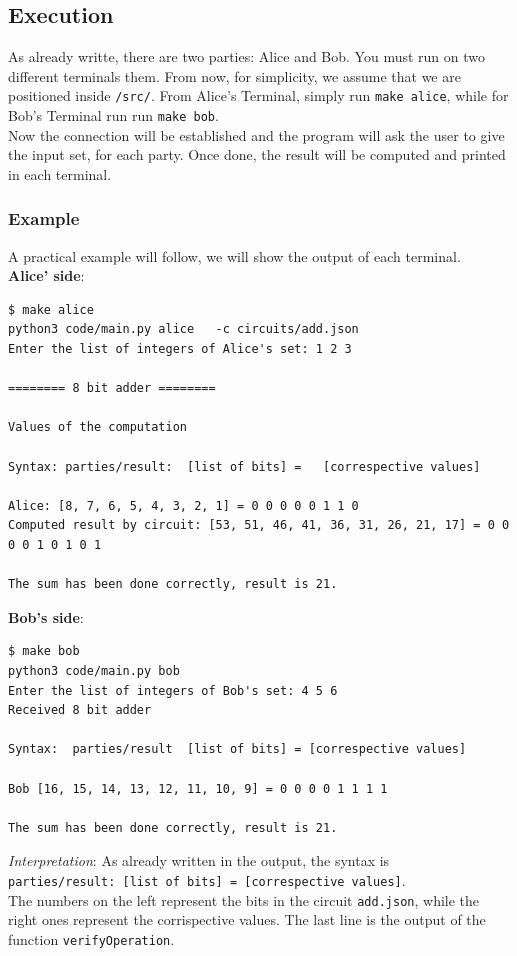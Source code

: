 \documentclass[12pt]{article}
\newcommand{\inlinecode}{\texttt}
\begin{document}
\subsection{Execution}
As already writte, there are two parties: Alice and Bob. You must run on two different terminals them. From now, for simplicity, we assume that we are positioned inside \inlinecode{/src/}.
From Alice's Terminal, simply run \inlinecode{make alice}, while for Bob's Terminal run run \inlinecode{make bob}.\\
Now the connection will be established and the program will ask the user to give the input set, for each party. Once done, the result will be computed and printed in each terminal.
\subsubsection{Example}
A practical example will follow, we will show the output of each terminal.\\
\textbf{Alice' side}:
\begin{lstlisting}[frame=single, basicstyle=\scriptsize]
$ make alice
python3 code/main.py alice   -c circuits/add.json
Enter the list of integers of Alice's set: 1 2 3

======== 8 bit adder ========

Values of the computation

Syntax: parties/result:  [list of bits] =   [correspective values]

Alice: [8, 7, 6, 5, 4, 3, 2, 1] = 0 0 0 0 0 1 1 0
Computed result by circuit: [53, 51, 46, 41, 36, 31, 26, 21, 17] = 0 0 0 0 1 0 1 0 1

The sum has been done correctly, result is 21.
\end{lstlisting}

\textbf{Bob's side}:
\begin{lstlisting}[frame=single, basicstyle=\scriptsize]
$ make bob
python3 code/main.py bob
Enter the list of integers of Bob's set: 4 5 6
Received 8 bit adder

Syntax:  parties/result  [list of bits] = [correspective values]

Bob [16, 15, 14, 13, 12, 11, 10, 9] = 0 0 0 0 1 1 1 1

The sum has been done correctly, result is 21.
\end{lstlisting}
\textit{Interpretation}: As already written in the output, the syntax is\\ \inlinecode{parties/result:  [list of bits] =   [correspective values]}.\\
The numbers on the left represent the bits in the circuit \inlinecode{add.json}, while the right ones represent the corrispective values. The last line is the output of the function \inlinecode{verifyOperation}.





\end{document}
